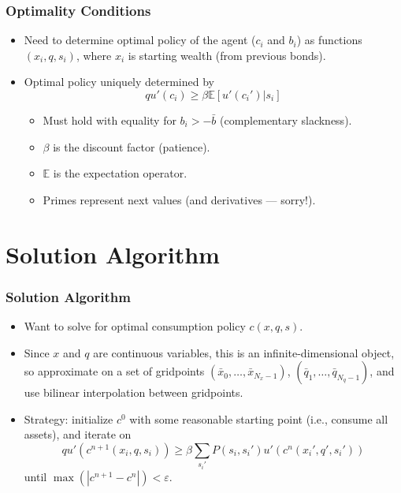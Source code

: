 \documentclass[handout]{beamer}
\newcommand{\E}{\mathbb{E}}
\newcommand{\eps}{\varepsilon}
\theoremstyle{definition}
\begin{document}
\begin{frame}
  \frametitle{Optimality Conditions}
  \begin{itemize}
  \item Need to determine optimal policy of the agent ($c_i$ and $b_i$) as functions $(x_i, q, s_i)$, where $x_i$ is starting wealth (from previous bonds).
  \item Optimal policy uniquely determined by
    \begin{equation*}
      q u'(c_i) \ge \beta \E \left[ u'(c_i') | s_i \right]
    \end{equation*}
    \begin{itemize}
    \item Must hold with equality for $b_i > -\bar{b}$ (complementary slackness).
    \item $\beta$ is the discount factor (patience).
    \item $\E$ is the expectation operator.
    \item Primes represent next values (and derivatives --- sorry!).
    \end{itemize}
  \end{itemize}
\end{frame}

\section{Solution Algorithm}

\begin{frame}
  \frametitle{Solution Algorithm}
  \begin{itemize}[<+->]
  \item Want to solve for optimal consumption policy $c(x, q, s)$.
  \item Since $x$ and $q$ are continuous variables, this is an infinite-dimensional object, so approximate on a set of gridpoints $(\bar{x}_0, \ldots, \bar{x}_{N_x-1})$, $(\bar{q}_1, \ldots, \bar{q}_{N_q-1})$, and use bilinear interpolation between gridpoints.
  \item Strategy: initialize $c^0$ with some reasonable starting point (i.e., consume all assets), and iterate on
    \begin{equation}
      \label{eq:foc}
      q u'(c^{n+1}(x_i, q, s_i)) \ge \beta \sum_{s_i'} P(s_i, s_i') u'(c^n(x_i', q', s_i'))
    \end{equation}
    until $\max( | c^{n+1} - c^n | ) < \eps$.
  \end{itemize}
\end{frame}
\end{document}
